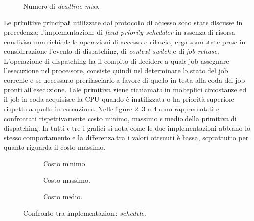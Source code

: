   \begin{figure}
    \graficoUno
    \caption{Numero di \textit{deadline miss}.} %
    \label{fig:DLM}
  \end{figure}

\noindent Le primitive principali utilizzate dal protocollo di accesso sono state discusse in precedenza; l'implementazione di \textit{fixed priority scheduler} in assenza di risorsa condivisa non richiede le operazioni di accesso e rilascio, ergo sono state prese in considerazione l'evento di dispatching, di \textit{context switch} e di \textit{job release}.\\

\noindent L'operazione di dispatching ha il compito di decidere a quale job assegnare l'esecuzione nel processore, consiste quindi nel determinare lo stato del job corrente e se necessario prerilasciarlo a favore di quello in testa alla coda dei job pronti all'esecuzione. Tale primitiva viene richiamata in molteplici circostanze ed il job in coda acquisisce la CPU quando è inutilizzata o ha priorità superiore rispetto a quello in esecuzione. Nelle figure \ref{fig:schedMin}, \ref{fig:schedMax} e \ref{fig:schedAvg} sono rappresentati e confrontati rispettivamente costo minimo, massimo e medio della primitiva di dispatching. In tutti e tre i grafici si nota come le due implementazioni abbiano lo stesso comportamento e la differenza tra i valori ottenuti è bassa, soprattutto per quanto riguarda il costo massimo.\\

  \begin{figure}[htb]
    \centering
      \begin{subfigure}[b]{0.49\textwidth}
        \centering
        \resizebox{\linewidth}{!}\graficoSchedMIN  
        \caption{Costo minimo.}
        \label{fig:schedMin}
      \end{subfigure}
      \begin{subfigure}[b]{0.49\textwidth}
        \centering
        \resizebox{\linewidth}{!}\graficoSchedMAX
        \caption{Costo massimo.}
        \label{fig:schedMax}
      \end{subfigure}
      \begin{subfigure}[b]{0.49\textwidth}
        \centering
        \resizebox{\linewidth}{!}\graficoSchedAVG
        \caption{Costo medio.}
        \label{fig:schedAvg}
      \end{subfigure}

    \caption{Confronto tra implementazioni: \textit{schedule}.}
    \label{fig:sched}
  \end{figure}

